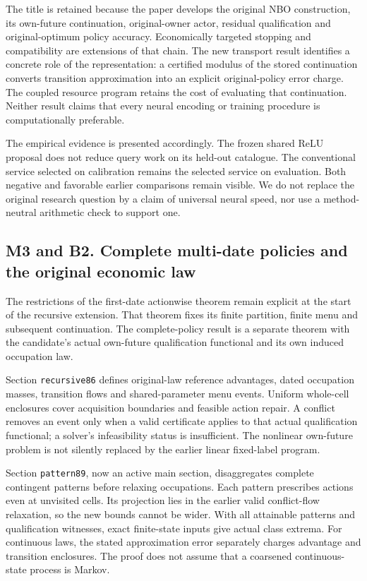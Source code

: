 The title is retained because the paper develops the original NBO
construction, its own-future continuation, original-owner actor,
residual qualification and original-optimum policy accuracy.
Economically targeted stopping and compatibility are extensions of that
chain. The new transport result identifies a concrete role of the
representation: a certified modulus of the stored continuation converts
transition approximation into an explicit original-policy error charge.
The coupled resource program retains the cost of evaluating that
continuation. Neither result claims that every neural encoding or
training procedure is computationally preferable.

The empirical evidence is presented accordingly. The frozen shared ReLU
proposal does not reduce query work on its held-out catalogue. The
conventional service selected on calibration remains the selected
service on evaluation. Both negative and favorable earlier comparisons
remain visible. We do not replace the original research question by a
claim of universal neural speed, nor use a method-neutral arithmetic
check to support one.

\hypertarget{m3-and-b2.-complete-multi-date-policies-and-the-original-economic-law}{%
\subsection{M3 and B2. Complete multi-date policies and the original
economic
law}\label{m3-and-b2.-complete-multi-date-policies-and-the-original-economic-law}}

The restrictions of the first-date actionwise theorem remain explicit at
the start of the recursive extension. That theorem fixes its finite
partition, finite menu and subsequent continuation. The complete-policy
result is a separate theorem with the candidate's actual own-future
qualification functional and its own induced occupation law.

Section \texttt{recursive86} defines original-law reference advantages,
dated occupation masses, transition flows and shared-parameter menu
events. Uniform whole-cell enclosures cover acquisition boundaries and
feasible action repair. A conflict removes an event only when a valid
certificate applies to that actual qualification functional; a solver's
infeasibility status is insufficient. The nonlinear own-future problem
is not silently replaced by the earlier linear fixed-label program.

Section \texttt{pattern89}, now an active main section, disaggregates
complete contingent patterns before relaxing occupations. Each pattern
prescribes actions even at unvisited cells. Its projection lies in the
earlier valid conflict-flow relaxation, so the new bounds cannot be
wider. With all attainable patterns and qualification witnesses, exact
finite-state inputs give actual class extrema. For continuous laws, the
stated approximation error separately charges advantage and transition
enclosures. The proof does not assume that a coarsened continuous-state
process is Markov.

